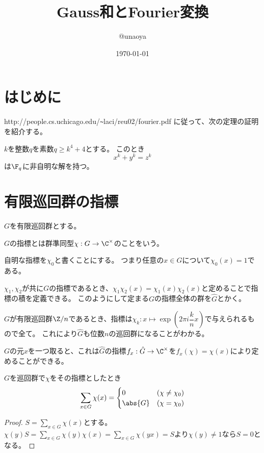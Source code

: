 \documentclass{jsarticle}
\title{Gauss和とFourier変換}
\author{@unaoya}
\date{\today}
\begin{document}
\maketitle
\section{はじめに}
http://people.cs.uchicago.edu/\verb|~|laci/reu02/fourier.pdf
に従って、次の定理の証明を紹介する。

\begin{thm}
$k$を整数$q$を素数$q\geq k^4+4$とする。
このとき
\[
x^k+y^k=z^k
\]
は$\F_q$に非自明な解を持つ。
\end{thm}

\section{有限巡回群の指標}
$G$を有限巡回群とする。
\begin{dfn}[指標]
$G$の指標とは群準同型$\chi: G\to \C^\times$のことをいう。

自明な指標を$\chi_0$と書くことにする。
つまり任意の$x\in G$について$\chi_0(x)=1$である。
\end{dfn}

$\chi_1, \chi_2$が共に$G$の指標であるとき、$\chi_1\chi_2(x)=\chi_1(x)\chi_2(x)$と定めることで指標の積を定義できる。
このようにして定まる$G$の指標全体の群を$\hat{G}$とかく。

$G$が有限巡回群$\Z/n$であるとき、指標は$\chi_k:x\mapsto\exp(2\pi i\dfrac{k}{n}x)$で与えられるもので全て。
これにより$\hat{G}$も位数$n$の巡回群になることがわかる。

$G$の元$x$を一つ取ると、これは$\hat{G}$の指標$f_x:\hat{G} \to \C^\times$を$f_x(\chi)=\chi(x)$により定めることができる。

\begin{lem}
$G$を巡回群で$\chi$をその指標としたとき
\begin{align*}
\sum_{x\in G}\chi(x)=\begin{cases}0&(\chi\neq\chi_0)\\\abs{G}&(\chi=\chi_0)\end{cases}
\end{align*}
\end{lem}
\begin{proof}
$S=\displaystyle\sum_{x\in G}\chi(x)$とする。
$\chi(y)S=\displaystyle\sum_{x\in G}\chi(y)\chi(x)=\displaystyle\sum_{x\in G}\chi(yx)=S$より$\chi(y)\neq1$なら$S=0$となる。
\end{proof}
\end{document}
